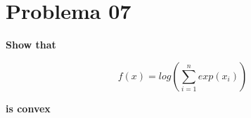 \section*{Problema 07}

\textbf{Show that}

\begin{equation*}
    f(x) = log\left ( \sum_{i=1}^n exp(x_i) \right )
\end{equation*}

\textbf{is convex}
